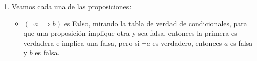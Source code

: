\documentclass[12pt]{article}
\begin{document}
\begin{enumerate}
\begin{enumerate}
\begin{itemize}
            \item \textbf{t: A partir de los valores de verdad de $p, q, r$ y $s$ obtenidos, podemos afirmar que $\left(r \vee p\right) \implies \left(\lnot s \implies q\right)$ es verdadero.}: Apoyémonos en las tablas de verdad de las operaciones que aparecen:\\
            Trabajemos por partes dentro de esta proposición con los valores de verdad que obtuvimos. \begin{itemize}
                \item $\left(r \vee p\right)$: Con $r$ verdadera y $p$ falsa 
                    \begin{gather*}
                        \left(r \vee p\right)\\
                        \left(V \vee F\right)\\
                        V
                    \end{gather*} 
                \item $\left(\lnot s \implies q\right)$: Con $s$ verdadera y $q$ falsa 
                    \begin{gather*}
                        \left(\lnot s \implies q\right)\\
                        \left(\lnot V \implies F\right)\\
                        \left(F \implies F\right)\\
                        V
                    \end{gather*}
                \item $\left(r \vee p\right) \implies \left(\lnot s \implies q\right)$: Con lo que obtuvimos en los items anteriores resultaría:
                    \begin{gather*}
                        \left(r \vee p\right) \implies \left(\lnot s \implies q\right)\\
                        V \implies V\\
                        V
                    \end{gather*}
            \end{itemize}
        \end{itemize}
        \item Veamos cada una de las proposiciones:\begin{itemize}
            \item $\left(\lnot a \implies b\right)$ es Falso, mirando la tabla de verdad de condicionales, para que una proposición implique otra y sea falsa, entonces la primera es verdadera e implica una falsa, pero si $\lnot a$ es verdadero, entonces $a$ es falsa y $b$ es falsa.

\end{itemize}
\end{enumerate}
\end{enumerate}
\end{document}
